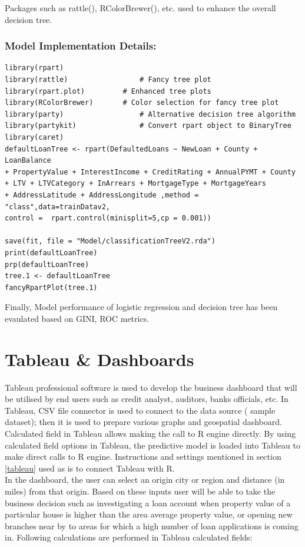 Packages such as rattle(), RColorBrewer(), etc. used to enhance the overall decision tree.

\subsubsection*{Model Implementation Details:}

\begin{verbatim}
library(rpart)
library(rattle)					# Fancy tree plot
library(rpart.plot)			# Enhanced tree plots
library(RColorBrewer)		# Color selection for fancy tree plot
library(party)					# Alternative decision tree algorithm
library(partykit)				# Convert rpart object to BinaryTree
library(caret)
defaultLoanTree <- rpart(DefaultedLoans ~ NewLoan + County + LoanBalance 
+ PropertyValue + InterestIncome + CreditRating + AnnualPYMT + County 
+ LTV + LTVCategory + InArrears + MortgageType + MortgageYears 
+ AddressLatitude + AddressLongitude ,method = "class",data=trainDatav2,
control =  rpart.control(minisplit=5,cp = 0.001))

save(fit, file = "Model/classificationTreeV2.rda")
print(defaultLoanTree)
prp(defaultLoanTree)
tree.1 <- defaultLoanTree
fancyRpartPlot(tree.1)
\end{verbatim}

Finally, Model performance of logistic regression and decision tree has been evaulated based on GINI, ROC metrics.

\section{Tableau \& Dashboards} 

Tableau professional software is used to develop the business dashboard that will be utilised by end users such as credit analyst, auditors, banks officials, etc. In Tableau, CSV file connector is used to connect to the data source ( sample dataset); then it is used to prepare various graphs and geospatial dashboard. Calculated field in Tableau allows making the call to R engine directly. By using calculated field options in Tableau, the predictive model is loaded into Tableau to make direct calls to R engine. Instructions and settings mentioned in section \ref{tableau} used as is to connect Tableau with R. \\

In the dashboard, the user can select an origin city or region and distance (in miles) from that origin. Based on these inputs user will be able to take the business decision such as investigating a loan account when property value of a particular house is higher than the area average property value, or opening new branches near by to areas for which a high number of loan applications is coming in. Following calculations are performed in Tableau calculated fields:

